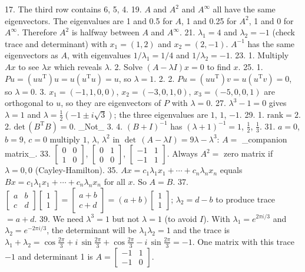 17. The third row contains 6, 5, 4.
19. \(A\) and \(A^{2}\) and \(A^{\infty}\) all have the same eigenvectors. The eigenvalues are 1 and 0.5 for \(A\), 1 and 0.25 for \(A^{2}\), 1 and 0 for \(A^{\infty}\). Therefore \(A^{2}\) is halfway between \(A\) and \(A^{\infty}\).
21. \(\lambda_{1}=4\) and \(\lambda_{2}=-1\) (check trace and determinant) with \(x_{1}=(1,2)\) and \(x_{2}=(2,-1)\). \(A^{-1}\) has the same eigenvectors as \(A\), with eigenvalues \(1/\lambda_{1}=1/4\) and \(1/\lambda_{2}=-1\).
23. 1. Multiply \(Ax\) to see \(\lambda x\) which reveals \(\lambda\). 2. Solve \((A-\lambda I)x=0\) to find \(x\).
25. 1. \(Pu=(uu^{\mathrm{T}})u=u(u^{\mathrm{T}}u)=u\), so \(\lambda=1\). 2. 2. \(Pu=(uu^{\mathrm{T}})v=u(u^{\mathrm{T}}v)=0\), so \(\lambda=0\). 3. \(x_{1}=(-1,1,0,0)\), \(x_{2}=(-3,0,1,0)\), \(x_{3}=(-5,0,0,1)\) are orthogonal to \(u\), so they are eigenvectors of \(P\) with \(\lambda=0\).
27. \(\lambda^{3}-1=0\) gives \(\lambda=1\) and \(\lambda=\frac{1}{2}(-1\pm i\sqrt{3})\); the three eigenvalues are \(1\), \(1\), \(-1\).
29. 1. \(\mathrm{rank}=2\). 2. \(\mathrm{det}\,(B^{\mathrm{T}}B)=0\). _Not_ 3. 4. \((B+I)^{-1}\) has \((\lambda+1)^{-1}=1\), \(\frac{1}{2}\), \(\frac{1}{3}\).
31. \(a=0\), \(b=9\), \(c=0\) multiply \(1\), \(\lambda\), \(\lambda^{2}\) in \(\det\,(A-\lambda I)=9\lambda-\lambda^{3}\): \(A=\) _companion matrix_.
33. \(\begin{bmatrix}0&0\\ 1&0\end{bmatrix}\), \(\begin{bmatrix}0&1\\ 0&0\end{bmatrix}\), \(\begin{bmatrix}-1&1\\ -1&1\end{bmatrix}\). Always \(A^{2}=\) zero matrix if \(\lambda=0,0\) (Cayley-Hamilton).
35. \(Ax=c_{1}\lambda_{1}x_{1}+\cdots+c_{n}\lambda_{n}x_{n}\) equals \(Bx=c_{1}\lambda_{1}x_{1}+\cdots+c_{n}\lambda_{n}x_{n}\) for all \(x\). So \(A=B\).
37. \(\begin{bmatrix}a&b\\ c&d\end{bmatrix}\begin{bmatrix}1\\ 1\end{bmatrix}=\begin{bmatrix}a+b\\ c+d\end{bmatrix}=(a+b)\begin{bmatrix}1\\ 1\end{bmatrix}\); \(\lambda_{2}=d-b\) to produce trace \(=a+d\).
39. We need \(\lambda^{3}=1\) but not \(\lambda=1\) (to avoid \(I\)). With \(\lambda_{1}=e^{2\pi i/3}\) and \(\lambda_{2}=e^{-2\pi i/3}\), the determinant will be \(\lambda_{1}\lambda_{2}=1\) and the trace is \(\lambda_{1}+\lambda_{2}=\cos\frac{2\pi}{3}+i\,\sin\frac{2\pi}{3}+\cos\frac{2 \pi}{3}-i\,\sin\frac{2\pi}{3}=-1\). One matrix with this trace \(-1\) and determinant 1 is \(A=\begin{bmatrix}-1&1\\ -1&0\end{bmatrix}\).

